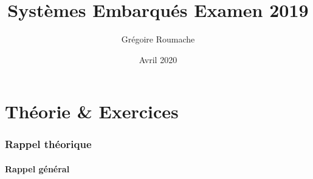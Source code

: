 \documentclass[a4paper]{article}
\title{Systèmes Embarqués Examen 2019}
\author{Grégoire Roumache}
\date{Avril 2020}
\begin{document}
\maketitle




















\part{Théorie \& Exercices}















\section{Rappel théorique}










\subsection{Rappel général}
\end{document}
